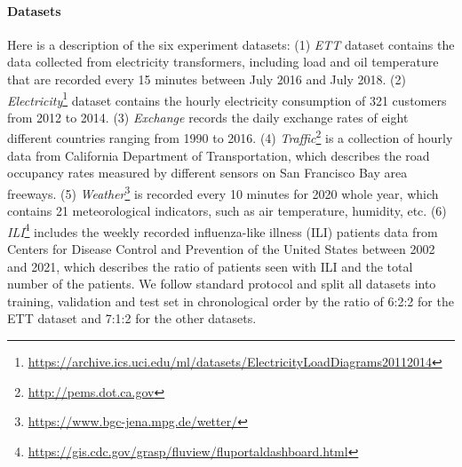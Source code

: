 \paragraph{Datasets} Here is a description of the six experiment datasets: 
(1) \textit{ETT} \cite{haoyietal-informer-2021} dataset contains the data collected from electricity transformers, including load and oil temperature that are recorded every 15 minutes between July 2016 and July 2018. 
(2) \textit{Electricity}\footnote{\url{https://archive.ics.uci.edu/ml/datasets/ElectricityLoadDiagrams20112014}} dataset contains the hourly electricity consumption of 321 customers from 2012 to 2014.
(3) \textit{Exchange} \cite{2018Modeling} records the daily exchange rates of eight different countries
ranging from 1990 to 2016.
(4) \textit{Traffic}\footnote{\url{http://pems.dot.ca.gov}} is a collection of hourly data from California Department of Transportation, which describes the road occupancy rates measured by different sensors on San Francisco Bay area freeways. 
(5) \textit{Weather}\footnote{\url{https://www.bgc-jena.mpg.de/wetter/}} is recorded every 10 minutes for 2020 whole year, which contains 21 meteorological indicators, such as air temperature, humidity, etc.
(6) \textit{ILI}\footnote{\url{https://gis.cdc.gov/grasp/fluview/fluportaldashboard.html}} includes the weekly recorded influenza-like illness (ILI) patients data from Centers for Disease Control and Prevention of the United States between 2002 and 2021, which describes the ratio of patients seen with ILI and the total number of the patients. We follow standard protocol and split all datasets into training, validation and test set in chronological order by the ratio of 6:2:2 for the ETT dataset and 7:1:2 for the other datasets.

